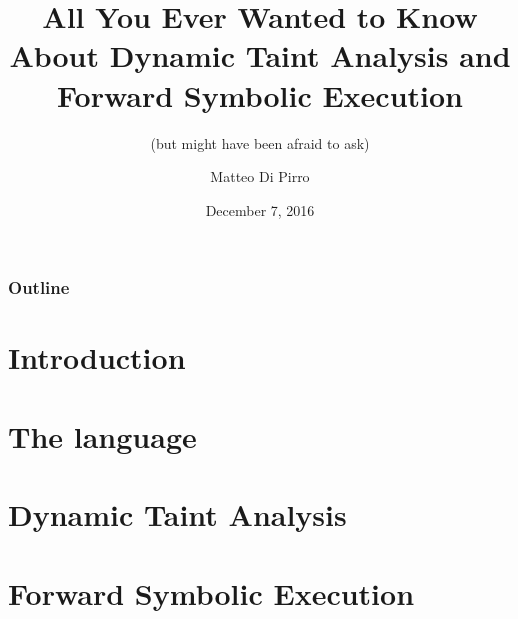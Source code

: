 \documentclass{beamer}
\title{All You Ever Wanted to Know About Dynamic Taint Analysis and Forward Symbolic Execution}
\subtitle{(but might have been afraid to ask)}
\author{Matteo Di Pirro}
\date{December 7, 2016}
\institute{University of Padova}
\begin{document}
\begin{frame}
\titlepage
\end{frame}

\begin{frame}
	\frametitle{Outline}
	\tableofcontents
\end{frame}

\section{Introduction}
%




\section{The language}


\section{Dynamic Taint Analysis}



\section{Forward Symbolic Execution}




\appendix
\makethanks
\end{document}
